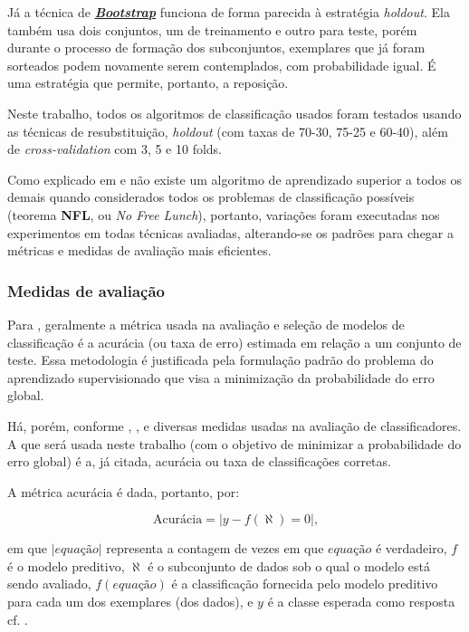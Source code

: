 Já a técnica de \textit{\textbf{\underline{Bootstrap}}} funciona de forma  parecida à estratégia \textit{holdout}. Ela também usa dois conjuntos, um de treinamento e outro para teste, porém durante o processo de formação dos subconjuntos, exemplares que já foram sorteados podem novamente serem contemplados, com probabilidade igual. É uma estratégia que permite, portanto, a reposição.

Neste trabalho, todos os algoritmos de classificação usados foram testados usando as técnicas de resubstituição, \textit{holdout} (com taxas de 70-30, 75-25 e 60-40), além de \textit{cross-validation} com 3, 5 e 10 folds. 

Como explicado em  e  não existe um algoritmo de aprendizado superior a todos os demais quando considerados todos os problemas de classificação possíveis (teorema \textbf{NFL}, ou \textit{No Free Lunch}), portanto, variações foram executadas nos experimentos em todas técnicas avaliadas, alterando-se os padrões para chegar a métricas e medidas de avaliação mais eficientes.

\subsubsection{Medidas de avaliação}\label{medidas_avaliacao}

Para , geralmente a métrica usada na avaliação e seleção de modelos de classificação é a acurácia (ou taxa de erro) estimada em relação a um conjunto de teste. Essa metodologia é justificada pela formulação padrão do problema do aprendizado supervisionado que visa a minimização da probabilidade do erro global. 

Há, porém, conforme , ,  e  diversas medidas usadas na avaliação de classificadores. A que será usada neste trabalho (com o objetivo de minimizar a probabilidade do erro global) é a, já citada, acurácia ou taxa de classificações corretas. 

A métrica acurácia é dada, portanto, por:

\begin{equation}\label{acuracia}
	\textrm{Acurácia} = |y-f(\aleph)=0|\textrm{,}
\end{equation}

em que $|equação|$ representa a contagem de vezes em que $equação$ é verdadeiro, $f$ é o modelo preditivo, $\aleph$ é o subconjunto de dados sob o qual o modelo está sendo avaliado, $f(equação)$ é a classificação fornecida pelo modelo preditivo para cada um dos exemplares (dos dados), e $y$ é a classe esperada como resposta cf. .

